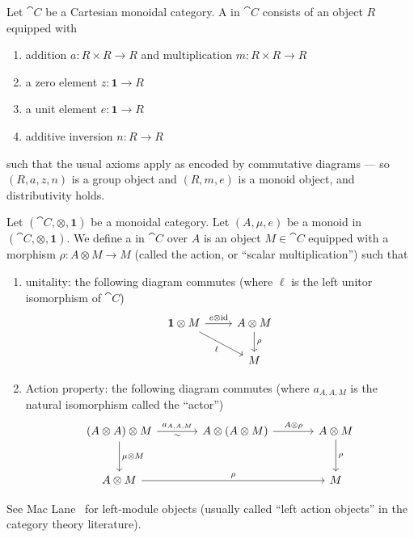 \begin{node}\label{internal-000H}%
\begin{definition}
Let $\cat{C}$ be a Cartesian monoidal category. A 
in $\cat{C}$ consists of an object $R$ equipped with
\begin{enumerate}
\item addition $a\colon R\times R\to R$ and multiplication $m\colon R\times R\to R$
\item a zero element $z\colon\mathbf{1}\to R$
\item a unit element $e\colon\mathbf{1}\to R$
\item additive inversion $n\colon R\to R$
\end{enumerate}
such that the usual axioms apply as encoded by commutative diagrams ---
so $(R,a,z,n)$ is a group object and $(R,m,e)$ is a monoid object, and
distributivity holds.
\end{definition}

\begin{definition}
Let $(\cat{C},\otimes,\mathbf{1})$ be a monoidal category. Let
$(A,\mu,e)$ be a monoid in $(\cat{C},\otimes,\mathbf{1})$.
We define a  in $\cat{C}$ over $A$ is an
object $M\in\cat{C}$ equipped with a morphism $\rho\colon A\otimes M\to M$
(called the action, or ``scalar multiplication'') such that
\begin{enumerate}
\item unitality: the following diagram commutes (where $\ell$ is the
  left unitor isomorphism of $\cat{C}$)
\begin{equation*}
\begin{tikzcd}
\mathbf{1}\otimes M\arrow[dr,swap,"\ell"]\ar[r,"e\otimes\id"] & A\otimes M\ar[d,"\rho"]\\
& M
\end{tikzcd}
\end{equation*}
\item Action property: the following diagram commutes (where $a_{A,A,M}$
  is the natural isomorphism called the ``actor'')
\begin{equation*}
\begin{tikzcd}[sep=large]
(A\otimes A)\otimes M \ar[r,"a_{A,A,M}","\sim"']\ar[d,"\mu\otimes M"] &A\otimes(A\otimes M)\ar[r,"A\otimes\rho"] & A\otimes M\ar[d,"\rho"]\\
A\otimes M \ar[rr,"\rho"] & & M
\end{tikzcd}
\end{equation*}
\end{enumerate}
\end{definition}

\begin{node}[References]\label{internal-000I}%
See Mac Lane~\cite[VII\S4]{mac1998categories} for left-module objects
(usually called ``left action objects'' in the category theory literature).
\end{node}
\end{node}

